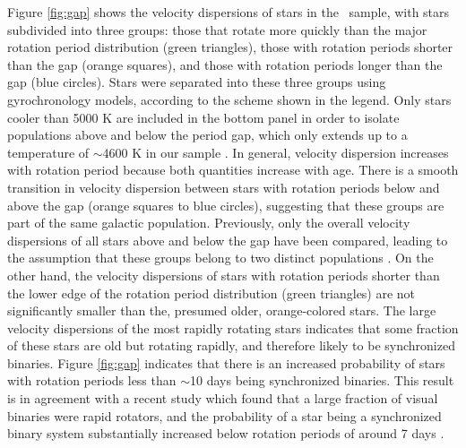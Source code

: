 Figure \ref{fig:gap} shows the velocity dispersions of stars in the \mct\
sample, with stars subdivided into three groups: those that rotate more
quickly than the major rotation period distribution (green triangles), those
with rotation periods shorter than the gap (orange squares), and those with
rotation periods longer than the gap (blue circles).
Stars were separated into these three groups using \citet{angus2019}
gyrochronology models, according to the scheme shown in the legend.
Only stars cooler than 5000 K are included in the bottom panel in order to
isolate populations above and below the period gap, which only extends up to a
temperature of $\sim$4600 K in our sample \citep[Although][found that the gap
extends to temperatures as hot as 6000 K]{davenport2017}.
In general, velocity dispersion increases with rotation period because both
quantities increase with age.
There is a smooth transition in velocity dispersion between stars with
rotation periods below and above the gap (orange squares to blue circles),
suggesting that these groups are part of the same galactic population.
Previously, only the overall velocity dispersions of all stars above and below
the gap have been compared, leading to the assumption that these groups belong
to two distinct populations \citep{mcquillan2014}.
On the other hand, the velocity dispersions of stars with rotation periods
shorter than the lower edge of the rotation period distribution (green
triangles) are not significantly smaller than the, presumed older,
orange-colored stars.
The large velocity dispersions of the most rapidly rotating stars indicates
that some fraction of these stars are old but rotating rapidly, and therefore
likely to be synchronized binaries.
Figure \ref{fig:gap} indicates that there is an increased probability of stars
with rotation periods less than $\sim$10 days being synchronized binaries.
This result is in agreement with a recent study which found that a large
fraction of visual binaries were rapid rotators, and the probability of a star
being a synchronized binary system substantially increased below rotation
periods of around 7 days \citep{simonian2019}.

